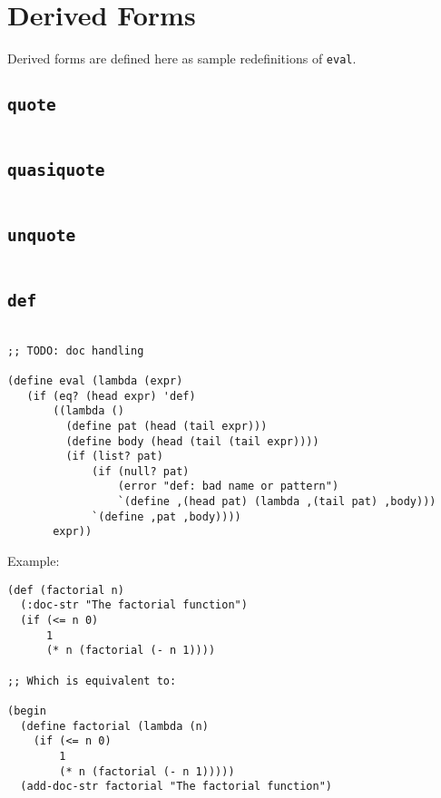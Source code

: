 \section{Derived Forms}

Derived forms are defined here as sample redefinitions of \texttt{eval}.


\subsection*{\texttt{quote}}

\begin{verbatim}
\end{verbatim}

\subsection*{\texttt{quasiquote}}

\begin{verbatim}
\end{verbatim}

\subsection*{\texttt{unquote}}

\begin{verbatim}
\end{verbatim}

\subsection*{\texttt{def}}

\begin{verbatim}

;; TODO: doc handling

(define eval (lambda (expr)
   (if (eq? (head expr) 'def)
       ((lambda ()
         (define pat (head (tail expr)))
         (define body (head (tail (tail expr))))
         (if (list? pat)
             (if (null? pat)
                 (error "def: bad name or pattern")
                 `(define ,(head pat) (lambda ,(tail pat) ,body)))
             `(define ,pat ,body))))
       expr))

\end{verbatim}

Example:

\begin{verbatim}
(def (factorial n)
  (:doc-str "The factorial function")
  (if (<= n 0)
      1
      (* n (factorial (- n 1))))

;; Which is equivalent to:

(begin
  (define factorial (lambda (n)
    (if (<= n 0)
        1
        (* n (factorial (- n 1)))))
  (add-doc-str factorial "The factorial function")
\end{verbatim}
